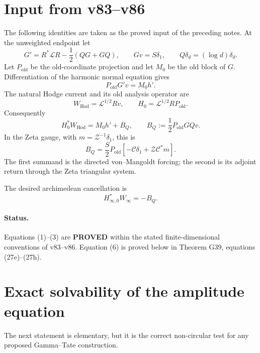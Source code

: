 \documentclass[11pt]{article}
\newcommand{\PROVED}{\textcolor{green!45!black}{\textbf{PROVED}}}
\newcommand{\old}{\mathrm{old}}
\newcommand{\Hod}{\mathrm{Hod}}
\newcommand{\cC}{\mathscr C}
\newcommand{\cZ}{\mathscr Z}
\newcommand{\cL}{\mathscr L}
\begin{document}
\section{Input from v83--v86}

The following identities are taken as the proved input of the preceding
notes.  At the unweighted endpoint let
\[
 G'=R^*\cL R-\frac12(QG+GQ),\qquad Gv=S\delta_1,
 \qquad Q\delta_d=(\log d)\delta_d .
\]
Let $P_{\old}$ be the old-coordinate projection and let $M_0$ be the old
block of $G$.  Differentiation of the harmonic normal equation gives
\begin{equation}
 P_{\old}G'v=M_0h'.                                      \tag{1}
\end{equation}
The natural Hodge current and its old analysis operator are
\[
 W_{\Hod}=\cL^{1/2}Rv,
 \qquad H_0=\cL^{1/2}RP_{\old}.
\]
Consequently
\begin{equation}
 H_0^*W_{\Hod}=M_0h'+B_Q,
 \qquad B_Q:=\frac12P_{\old}GQv.                         \tag{2}
\end{equation}
In the Zeta gauge, with $m=\cZ^{-1}\delta_1$, this is
\begin{equation}
 B_Q=\frac S2P_{\old}
 \left[-\cC\delta_1+\cZ\cC^*m\right].                  \tag{3}
\end{equation}
The first summand is the directed von--Mangoldt forcing; the second is its
adjoint return through the Zeta triangular system.

The desired archimedean cancellation is
\begin{equation}
 H_{\infty,0}^*W_\infty=-B_Q.                            \tag{6}
\end{equation}

\paragraph{Status.} Equations (1)--(3) are \PROVED{} within the stated
finite-dimensional conventions of v83--v86.  Equation (6) is proved below in
Theorem G39, equations (27e)--(27h).

\section{Exact solvability of the amplitude equation}

The next statement is elementary, but it is the correct non-circular test for
any proposed Gamma--Tate construction.
\end{document}
